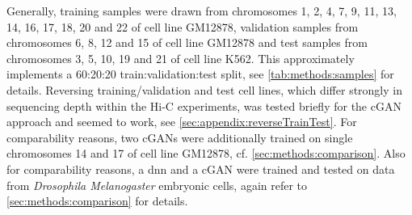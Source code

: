 Generally, training samples were drawn from chromosomes 1, 2, 4, 7, 9, 11, 13, 14, 16, 17, 18, 20 and 22 of cell line GM12878, 
validation samples from chromosomes 6, 8, 12 and 15 of cell line GM12878 and test samples from chromosomes 3, 5, 10, 19 and 21 of cell line K562.
This approximately implements a 60:20:20 train:validation:test split, see \cref{tab:methods:samples} for details.
Reversing training/validation and test cell lines, which differ strongly in sequencing depth within the Hi-C experiments, 
was tested briefly for the cGAN approach and seemed to work, see \cref{sec:appendix:reverseTrainTest}.
For comparability reasons, two cGANs were additionally trained on single chromosomes 14 and 17 of cell line GM12878,  cf. \cref{sec:methods:comparison}.
Also for comparability reasons, a \acrshort{dnn} and a cGAN were trained and tested on data from \emph{Drosophila Melanogaster} embryonic cells, again refer to \cref{sec:methods:comparison}
for details.

